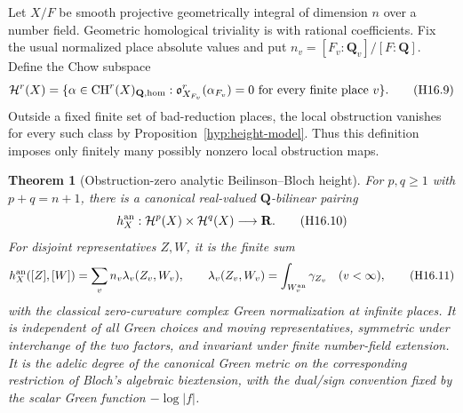 \documentclass[11pt,a4paper]{article}
\newtheorem{theorem}{Theorem}[section]
\theoremstyle{definition}
\theoremstyle{remark}
\numberwithin{equation}{section}
\begin{document}
Let $X/F$ be smooth projective geometrically integral of dimension $n$
over a number field. Geometric homological triviality is with rational
coefficients. Fix the usual normalized place absolute values and put
$n_v=[F_v:\mathbf Q_v]/[F:\mathbf Q]$. Define the Chow subspace
\[
 \mathcal H^r(X)=\{\alpha\in\operatorname{CH}^r(X)_{\mathbf Q,\rm hom}:
       \mathfrak o_{X_{F_v}}^r(\alpha_{F_v})=0
                    \text{ for every finite place }v\}.
 \tag{H16.9}\label{r16h:height-domain}
\]
Outside a fixed finite set of bad-reduction places, the local
obstruction vanishes for every such class by Proposition~\ref{hyp:height-model}.
Thus this definition imposes
only finitely many possibly nonzero local obstruction maps.

\begin{theorem}[Obstruction-zero analytic Beilinson--Bloch height]
\label{r16h:global-height}
For $p,q\geq1$ with $p+q=n+1$, there is a canonical real-valued
$\mathbf Q$-bilinear pairing
\[
 h_X^{\rm an}:\mathcal H^p(X)\times\mathcal H^q(X)\longrightarrow\mathbf R.
 \tag{H16.10}\label{r16h:height}
\]
For disjoint representatives $Z,W$, it is the finite sum
\[
 h_X^{\rm an}([Z],[W])
         =\sum_v n_v\lambda_v(Z_v,W_v),\qquad
 \lambda_v(Z_v,W_v)=\int_{W_v^{\rm an}}\gamma_{Z_v}\quad(v<\infty),
 \tag{H16.11}\label{r16h:height-sum}
\]
with the classical zero-curvature complex Green normalization at
infinite places. It is independent of all Green choices and moving
representatives, symmetric under interchange of the two factors, and
invariant under finite number-field extension. It is the adelic degree
of the canonical Green metric on the corresponding restriction of
Bloch's algebraic biextension, with the dual/sign convention fixed
by the scalar Green function $-\log|f|$.
\end{theorem}
\end{document}
